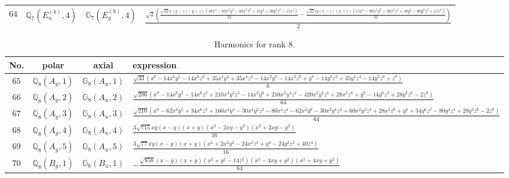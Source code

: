 \documentclass[fleqn,8pt,landscape]{jsarticle}
\begin{document}
\begin{table}[ht!]
\begin{center}
\begin{tabular}{cccl}
$ 64 $ & $ \mathbb{Q}_{7}(E_{u}^{(b)},4) $ & $ \mathbb{G}_{7}(E_{g}^{(b)},4) $ & $ \frac{\sqrt{2} \left(\frac{\sqrt{42} x \left(y - z\right) \left(y + z\right) \left(48 x^{4} - 80 x^{2} y^{2} - 80 x^{2} z^{2} + 15 y^{4} + 30 y^{2} z^{2} + 15 z^{4}\right)}{32} - \frac{\sqrt{42} i y \left(x - z\right) \left(x + z\right) \left(15 x^{4} - 80 x^{2} y^{2} + 30 x^{2} z^{2} + 48 y^{4} - 80 y^{2} z^{2} + 15 z^{4}\right)}{32}\right)}{2} $ \\
 \hline \hline
\end{tabular}
\end{center}
\end{table}
\begin{table}[ht!]
\begin{center}
\caption{Harmonics for rank 8.}
\renewcommand{\arraystretch}{1.3}
\begin{tabular}{cccl} \hline \hline
No. & polar & axial & expression \\ \hline
$ 65 $ & $ \mathbb{Q}_{8}(A_{g},1) $ & $ \mathbb{G}_{8}(A_{u},1) $ & $ \frac{\sqrt{33} \left(x^{8} - 14 x^{6} y^{2} - 14 x^{6} z^{2} + 35 x^{4} y^{4} + 35 x^{4} z^{4} - 14 x^{2} y^{6} - 14 x^{2} z^{6} + y^{8} - 14 y^{6} z^{2} + 35 y^{4} z^{4} - 14 y^{2} z^{6} + z^{8}\right)}{8} $ \\
$ 66 $ & $ \mathbb{Q}_{8}(A_{g},2) $ & $ \mathbb{G}_{8}(A_{u},2) $ & $ \frac{\sqrt{286} \left(x^{8} - 14 x^{6} y^{2} - 14 x^{6} z^{2} + 210 x^{4} y^{2} z^{2} - 14 x^{2} y^{6} + 210 x^{2} y^{4} z^{2} - 420 x^{2} y^{2} z^{4} + 28 x^{2} z^{6} + y^{8} - 14 y^{6} z^{2} + 28 y^{2} z^{6} - 2 z^{8}\right)}{64} $ \\
$ 67 $ & $ \mathbb{Q}_{8}(A_{g},3) $ & $ \mathbb{G}_{8}(A_{u},3) $ & $ \frac{\sqrt{210} \left(x^{8} - 62 x^{6} y^{2} + 34 x^{6} z^{2} + 160 x^{4} y^{4} - 30 x^{4} y^{2} z^{2} - 80 x^{4} z^{4} - 62 x^{2} y^{6} - 30 x^{2} y^{4} z^{2} + 60 x^{2} y^{2} z^{4} + 28 x^{2} z^{6} + y^{8} + 34 y^{6} z^{2} - 80 y^{4} z^{4} + 28 y^{2} z^{6} - 2 z^{8}\right)}{64} $ \\
$ 68 $ & $ \mathbb{Q}_{8}(A_{g},4) $ & $ \mathbb{G}_{8}(A_{u},4) $ & $ \frac{3 \sqrt{715} x y \left(x - y\right) \left(x + y\right) \left(x^{2} - 2 x y - y^{2}\right) \left(x^{2} + 2 x y - y^{2}\right)}{16} $ \\
$ 69 $ & $ \mathbb{Q}_{8}(A_{g},5) $ & $ \mathbb{G}_{8}(A_{u},5) $ & $ \frac{3 \sqrt{77} x y \left(x - y\right) \left(x + y\right) \left(x^{4} + 2 x^{2} y^{2} - 24 x^{2} z^{2} + y^{4} - 24 y^{2} z^{2} + 40 z^{4}\right)}{16} $ \\
$ 70 $ & $ \mathbb{Q}_{8}(B_{g},1) $ & $ \mathbb{G}_{8}(B_{u},1) $ & $ - \frac{\sqrt{858} \left(x - y\right) \left(x + y\right) \left(x^{2} + y^{2} - 14 z^{2}\right) \left(x^{2} - 4 x y + y^{2}\right) \left(x^{2} + 4 x y + y^{2}\right)}{64} $ \\

\end{tabular}
\end{center}
\end{table}
\end{document}

